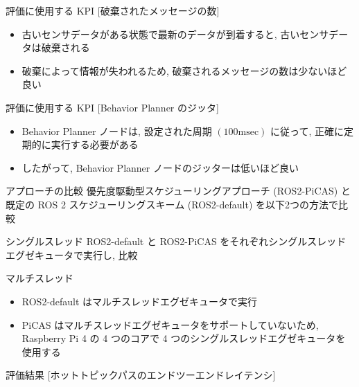 \begin{frame}{評価に使用する KPI [破棄されたメッセージの数]}
    \begin{itemize}
        \item 古いセンサデータがある状態で最新のデータが到着すると, 古いセンサデータは破棄される
        \item 破棄によって情報が失われるため, 破棄されるメッセージの数は少ないほど良い
    \end{itemize}
\end{frame}

\begin{frame}{評価に使用する KPI [Behavior Planner のジッタ]}
    \begin{itemize}
        \item Behavior Planner ノードは, 設定された周期 $(100 \mathrm{msec})$ に従って, 正確に定期的に実行する必要がある
        \item したがって, Behavior Planner ノードのジッターは低いほど良い
    \end{itemize}
\end{frame}

\begin{frame}{アプローチの比較}
    \vspace{-1mm}
    優先度駆動型スケジューリングアプローチ (ROS2-PiCAS) と既定の ROS 2 スケジューリングスキーム (ROS2-default) を以下2つの方法で比較
    \vspace{-1mm}
    \begin{block}{シングルスレッド}
        ROS2-default と ROS2-PiCAS をそれぞれシングルスレッドエグゼキュータで実行し, 比較
    \end{block}
    \begin{block}{マルチスレッド}
        \begin{itemize}
            \item ROS2-default はマルチスレッドエグゼキュータで実行
            \item PiCAS はマルチスレッドエグゼキュータをサポートしていないため, Raspberry Pi 4 の 4 つのコアで 4 つのシングルスレッドエグゼキュータを使用する
        \end{itemize}
    \end{block}
\end{frame}

\begin{frame}{評価結果 [ホットトピックパスのエンドツーエンドレイテンシ]}
\end{frame}

